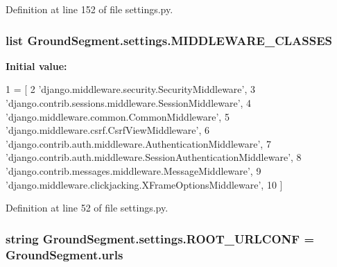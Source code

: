 Definition at line 152 of file settings.\+py.

\hypertarget{namespace_ground_segment_1_1settings_abd392b70ea7895ec177a28651e7616c8}{}
\subsubsection[{M\+I\+D\+D\+L\+E\+W\+A\+R\+E\+\_\+\+C\+L\+A\+S\+S\+E\+S}]{\setlength{\rightskip}{0pt plus 5cm}list Ground\+Segment.\+settings.\+M\+I\+D\+D\+L\+E\+W\+A\+R\+E\+\_\+\+C\+L\+A\+S\+S\+E\+S}\label{namespace_ground_segment_1_1settings_abd392b70ea7895ec177a28651e7616c8}
{\bfseries Initial value\+:}
\begin{DoxyCode}
1 = [
2     \textcolor{stringliteral}{'django.middleware.security.SecurityMiddleware'},
3     \textcolor{stringliteral}{'django.contrib.sessions.middleware.SessionMiddleware'},
4     \textcolor{stringliteral}{'django.middleware.common.CommonMiddleware'},
5     \textcolor{stringliteral}{'django.middleware.csrf.CsrfViewMiddleware'},
6     \textcolor{stringliteral}{'django.contrib.auth.middleware.AuthenticationMiddleware'},
7     \textcolor{stringliteral}{'django.contrib.auth.middleware.SessionAuthenticationMiddleware'},
8     \textcolor{stringliteral}{'django.contrib.messages.middleware.MessageMiddleware'},
9     \textcolor{stringliteral}{'django.middleware.clickjacking.XFrameOptionsMiddleware'},
10 ]
\end{DoxyCode}


Definition at line 52 of file settings.\+py.

\hypertarget{namespace_ground_segment_1_1settings_af881d9abde1eaf859b6067764a32059a}{}
\subsubsection[{R\+O\+O\+T\+\_\+\+U\+R\+L\+C\+O\+N\+F}]{\setlength{\rightskip}{0pt plus 5cm}string Ground\+Segment.\+settings.\+R\+O\+O\+T\+\_\+\+U\+R\+L\+C\+O\+N\+F = \textquotesingle{}Ground\+Segment.\+urls\textquotesingle{}}\label{namespace_ground_segment_1_1settings_af881d9abde1eaf859b6067764a32059a}


